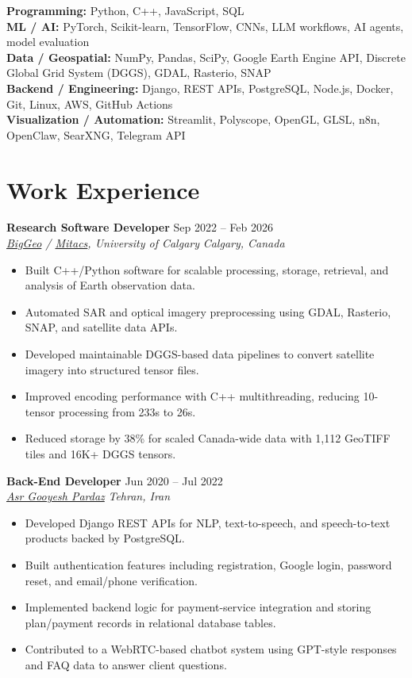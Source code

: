 \documentclass[a4paper,10pt]{article}
\newcommand{\resumeSubheading}[4]{
    \textbf{#1} \hfill #2 \\
    \textit{#3} \hfill \textit{#4}
}
\begin{document}
\textbf{Programming:} Python, C++, JavaScript, SQL \\
\textbf{ML / AI:} PyTorch, Scikit-learn, TensorFlow, CNNs, LLM workflows, AI agents, model evaluation \\
\textbf{Data / Geospatial:} NumPy, Pandas, SciPy, Google Earth Engine API, Discrete Global Grid System (DGGS), GDAL, Rasterio, SNAP \\
\textbf{Backend / Engineering:} Django, REST APIs, PostgreSQL, Node.js, Docker, Git, Linux, AWS, GitHub Actions \\
\textbf{Visualization / Automation:} Streamlit, Polyscope, OpenGL, GLSL, n8n, OpenClaw, SearXNG, Telegram API


\section*{Work Experience}

\resumeSubheading
{Research Software Developer}
{Sep 2022 -- Feb 2026}
{\href{https://biggeo.com}{BigGeo} / \href{https://www.mitacs.ca/}{Mitacs}, University of Calgary}
{Calgary, Canada}
\begin{itemize}[leftmargin=0.25in]
    \item Built C++/Python software for scalable processing, storage, retrieval, and analysis of Earth observation data.
    \item Automated SAR and optical imagery preprocessing using GDAL, Rasterio, SNAP, and satellite data APIs.
    \item Developed maintainable DGGS-based data pipelines to convert satellite imagery into structured tensor files.
    \item Improved encoding performance with C++ multithreading, reducing 10-tensor processing from 233s to 26s.
    \item Reduced storage by 38\% for scaled Canada-wide data with 1,112 GeoTIFF tiles and 16K+ DGGS tensors.
\end{itemize}

\resumeSubheading
{Back-End Developer}
{Jun 2020 -- Jul 2022}
{\href{https://asr-gooyesh.com/en/}{Asr Gooyesh Pardaz}}
{Tehran, Iran}
\begin{itemize}[leftmargin=0.25in]
    \item Developed Django REST APIs for NLP, text-to-speech, and speech-to-text products backed by PostgreSQL.
    \item Built authentication features including registration, Google login, password reset, and email/phone verification.
    \item Implemented backend logic for payment-service integration and storing plan/payment records in relational database tables.
    \item Contributed to a WebRTC-based chatbot system using GPT-style responses and FAQ data to answer client questions.
\end{itemize}
\end{document}
